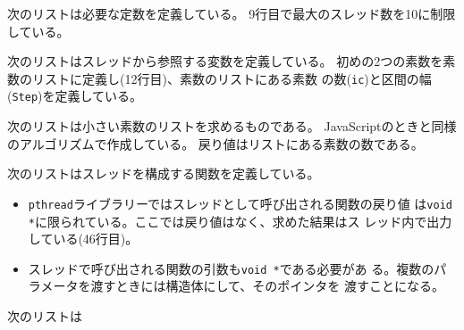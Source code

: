 	次のリストは必要な定数を定義している。
	9行目で最大のスレッド数を10に制限している。

	次のリストはスレッドから参照する変数を定義している。
	初めの2つの素数を素数のリストに定義し(12行目)、素数のリストにある素数
  の数(\texttt{ic})と区間の幅(\texttt{Step})を定義している。

	次のリストは小さい素数のリストを求めるものである。
	JavaScriptのときと同様のアルゴリズムで作成している。
  戻り値はリストにある素数の数である。

	次のリストはスレッドを構成する関数を定義している。
	\begin{itemize}
	 \item 	\texttt{pthread}ライブラリーではスレッドとして呼び出される関数の戻り値
  は\texttt{void *}に限られている。ここでは戻り値はなく、求めた結果はス
  レッド内で出力している(46行目)。
	 \item スレッドで呼び出される関数の引数も\texttt{void *}である必要があ
				 る。複数のパラメータを渡すときには構造体にして、そのポインタを
				 渡すことになる。
	\end{itemize}

	次のリストは
